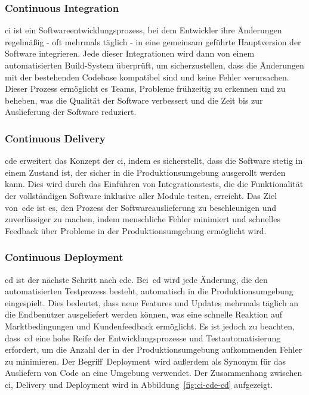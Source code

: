 \subsubsection{Continuous Integration}

\acrfull{ci} ist ein Softwareentwicklungsprozess, bei dem Entwickler ihre Änderungen
regelmäßig - oft mehrmals täglich - in eine gemeinsam geführte Hauptversion der Software integrieren.
Jede dieser Integrationen wird dann von einem automatisierten Build-System überprüft, um sicherzustellen, dass die
Änderungen mit der bestehenden Codebase kompatibel sind und keine Fehler verursachen.
Dieser Prozess ermöglicht es Teams, Probleme frühzeitig zu erkennen und zu beheben, was die Qualität der Software
verbessert und die Zeit bis zur Auslieferung der Software reduziert.

\subsubsection{Continuous Delivery}

\acrfull{cde} erweitert das Konzept der \acrlong{ci}, indem es sicherstellt, dass die
Software stetig in einem Zustand ist, der sicher in die Produktionsumgebung ausgerollt werden kann.
Dies wird durch das Einführen von Integrationstests, die die Funktionalität der vollständigen Software inklusive aller
Module testen, erreicht.
Das Ziel von\ \acrshort{cde} ist es, den Prozess der Softwareauslieferung zu beschleunigen und zuverlässiger zu machen,
indem menschliche Fehler minimiert und schnelles Feedback über Probleme in der Produktionsumgebung ermöglicht wird.

\subsubsection{Continuous Deployment}

\acrfull{cd} ist der nächste Schritt nach \acrlong{cde}.
Bei\ \acrshort{cd} wird jede Änderung, die den automatisierten Testprozess besteht, automatisch in die
Produktionsumgebung eingespielt.
Dies bedeutet, dass neue Features und Updates mehrmals täglich an die Endbenutzer ausgeliefert werden können, was eine
schnelle Reaktion auf Marktbedingungen und Kundenfeedback ermöglicht.
Es ist jedoch zu beachten, dass\ \acrshort{cd} eine hohe Reife der Entwicklungsprozesse und Testautomatisierung
erfordert, um die Anzahl der in der Produktionsumgebung aufkommenden Fehler zu minimieren.
Der Begriff\ \glqq Deployment\grqq\ wird außerdem als Synonym für das Ausliefern von Code an eine Umgebung verwendet.
Der Zusammenhang zwischen \acrlong{ci}, Delivery und Deployment wird in Abbildung\ \ref{fig:ci-cde-cd}
aufgezeigt.

